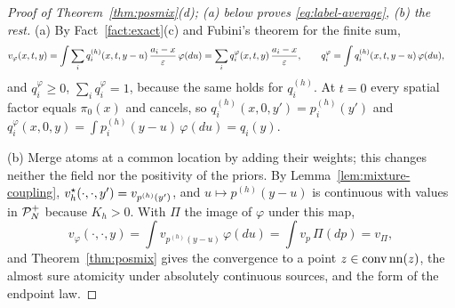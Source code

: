\documentclass{article} %
\newcommand{\iclrstart}{\begin{aligned}&}\newcommand{\iclrend}{\end{aligned}}
\newcommand{\iclrallow}{\allowbreak}
\newcommand{\iclrstart}{}\newcommand{\iclrend}{}\newcommand{\iclrallow}{}
\theoremstyle{plain}
\theoremstyle{definition}
\theoremstyle{remark}
\begin{document}
\label{apx:pf-filtered}
\begin{proof}[Proof of Theorem~\ref{thm:posmix}(d); (a) below proves \eqref{eq:label-average}, (b) the rest]
(a) By Fact~\ref{fact:exact}(c) and Fubini's theorem for the finite sum,
\[
\iclrstart v_\varphi(x,t,y)=\int\sum_iq^{(h)}_i(x,t,y-u)\,\frac{a_i-x}{\eps}\,\varphi(du)
\iclrbrq=\sum_iq^\varphi_i(x,t,y)\,\frac{a_i-x}{\eps},\iclrqbr
q^\varphi_i=\int q^{(h)}_i(x,t,y-u)\,\varphi(du),\iclrend
\]
and $q^\varphi_i\ge0$, $\sum_iq^\varphi_i=1$, because the same holds for $q^{(h)}_i$. At $t=0$ every
spatial factor equals $\pi_0(x)$ and cancels, so $q^{(h)}_i(x,0,y')=p_i^{(h)}(y')$ and
$q^\varphi_i(x,0,y)=\int p_i^{(h)}(y-u)\,\varphi(du)=q_i(y)$.

(b) Merge atoms at a common location by adding their weights; this changes neither the field nor
the positivity of the priors. By Lemma~\ref{lem:mixture-coupling},
$v_h^\star(\cdot,\cdot,y')=v_{p^{(h)}(y')}$, and $u\mapsto p^{(h)}(y-u)$ is continuous with values in
$\mathcal{P}_N^{+}$ because $K_h>0$. With $\Pi$ the image of $\varphi$ under this map,
\[
v_\varphi(\cdot,\cdot,y)=\int v_{p^{(h)}(y-u)}\,\varphi(du)=\int v_p\,\Pi(dp)=v_\Pi ,
\]
and Theorem~\ref{thm:posmix} gives the convergence to a point $z\in\operatorname{conv}\operatorname{nn}(z)$, the
almost sure atomicity under absolutely continuous sources, and the form of the endpoint law.
\end{proof}
\end{document}
